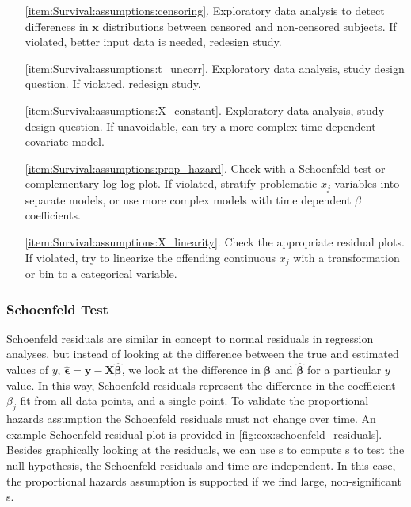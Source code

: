 \begin{itemize}[noitemsep]
  \item[\cref{item:Survival:assumptions:censoring}.] Exploratory data analysis to detect differences in $\mathbf{x}$ distributions between censored and non-censored subjects. If violated, better input data is needed, redesign study.

  \item[\cref{item:Survival:assumptions:t_uncorr}.] Exploratory data analysis, study design question. If violated, redesign study.

  \item[\cref{item:Survival:assumptions:X_constant}.] Exploratory data analysis, study design question. If unavoidable, can try a more complex time dependent covariate model.

  \item[\cref{item:Survival:assumptions:prop_hazard}.] Check with a Schoenfeld test or complementary log-log plot. If violated, stratify problematic $x_{j}$ variables into separate models, or use more complex models with time dependent $\beta$ coefficients.

  \item[\cref{item:Survival:assumptions:X_linearity}.] Check the appropriate residual plots. If violated, try to linearize the offending continuous $x_{j}$ with a transformation or bin to a categorical variable.
\end{itemize}

\subsubsection{Schoenfeld Test}
\label{additional:Survival:assumptions:schoenfeld}

Schoenfeld residuals are similar in concept to normal residuals in regression analyses,
but instead of looking at the difference between the true and estimated values of $y$,
$\hat{\bm{\epsilon}} = \mathbf{y} - \mathbf{X} \hat{\bm{\beta}}$,
we look at the difference in $\bm{\beta}$ and $\hat{\bm{\beta}}$ for a particular $y$ value.
In this way, Schoenfeld residuals represent the difference in the
coefficient $\beta_{j}$ fit from all data points, and a single point.
To validate the proportional hazards assumption
the Schoenfeld residuals \cite{schoenfeld} must not change over time.
An example Schoenfeld residual plot is provided in
\cref{fig:cox:schoenfeld_residuals}.
Besides graphically looking at the residuals,
we can use {\chiSqtest}s to compute {\pvalue}s
to test the null hypothesis, \ie the Schoenfeld residuals and time are independent.
In this case, the proportional hazards assumption is supported
if we find large, non-significant {\pvalue}s.

